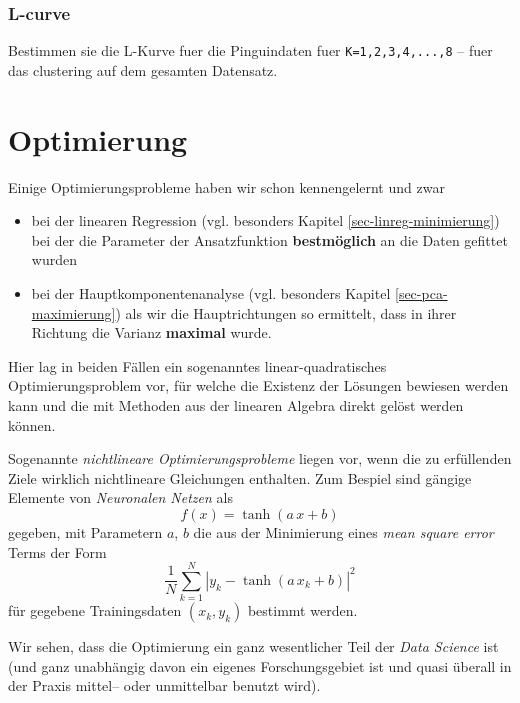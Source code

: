 \documentclass[]{book}
\providecommand{\tightlist}{%
  \setlength{\itemsep}{0pt}\setlength{\parskip}{0pt}}
\theoremstyle{definition}
\theoremstyle{definition}
\theoremstyle{definition}
\theoremstyle{definition}
\theoremstyle{remark}
\begin{document}
\hypertarget{l-curve}{%
\subsection{L-curve}\label{l-curve}}

Bestimmen sie die L-Kurve fuer die Pinguindaten fuer \texttt{K=1,2,3,4,...,8} -- fuer das clustering auf dem gesamten Datensatz.

\hypertarget{optimierung}{%
\chapter{Optimierung}\label{optimierung}}

\providecommand{\diva}[1]{\mathrm{d} #1}

Einige Optimierungsprobleme haben wir schon kennengelernt und zwar

\begin{itemize}
\tightlist
\item
  bei der linearen Regression (vgl. besonders Kapitel \ref{sec-linreg-minimierung}) bei der die Parameter der Ansatzfunktion \textbf{bestmöglich} an die Daten gefittet wurden
\item
  bei der Hauptkomponentenanalyse (vgl. besonders Kapitel \ref{sec-pca-maximierung}) als wir die Hauptrichtungen so ermittelt, dass in ihrer Richtung die Varianz \textbf{maximal} wurde.
\end{itemize}

Hier lag in beiden Fällen ein sogenanntes linear-quadratisches Optimierungsproblem vor, für welche die Existenz der Lösungen bewiesen werden kann und die mit Methoden aus der linearen Algebra direkt gelöst werden können.

Sogenannte \emph{nichtlineare Optimierungsprobleme} liegen vor, wenn die zu erfüllenden Ziele wirklich nichtlineare Gleichungen enthalten. Zum Bespiel sind gängige Elemente von \emph{Neuronalen Netzen} als
\begin{equation*}
f(x) = \tanh(a\, x + b)
\end{equation*}
gegeben, mit Parametern \(a\), \(b\) die aus der Minimierung eines \emph{mean square error} Terms der Form
\begin{equation*}
\frac 1N \sum_{k=1}^N|y_k - \tanh(a\, x_k + b)|^2
\end{equation*}
für gegebene Trainingsdaten \((x_k, y_k)\) bestimmt werden.

Wir sehen, dass die Optimierung ein ganz wesentlicher Teil der \emph{Data Science} ist (und ganz unabhängig davon ein eigenes Forschungsgebiet ist und quasi überall in der Praxis mittel-- oder unmittelbar benutzt wird).
\end{document}
